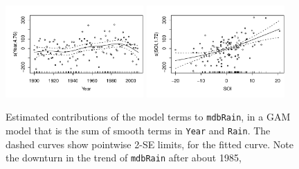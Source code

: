 \documentclass[12pt, a4paper,  BCOR=8.25mm, DIV=15]{scrartcl}\usepackage[]{graphicx}\usepackage[]{color}
\newenvironment{knitrout}{}{} %
\newcommand{\txtt}[1]{{\texttt{#1}}}
\begin{document}
\begin{figure}
\begin{knitrout}
\color{fgcolor}

{\centering \includegraphics[width=0.47\textwidth]{figs/xmeth-mdb-gam-12_9-1} 
\includegraphics[width=0.47\textwidth]{figs/xmeth-mdb-gam-12_9-2} 

}



\end{knitrout}
  \caption{Estimated contributions of the model terms to
    \txtt{mdbRain}, in a GAM model that is the sum of smooth terms in
    \txtt{Year} and \txtt{Rain}. The dashed curves show pointwise
    2-SE limits, for the fitted curve.  Note the downturn
in the trend of \txtt{mdbRain} after about 1985,}\label{fig:mdbRainSM}
\end{figure}
\end{document}
